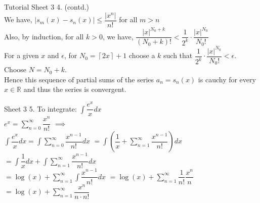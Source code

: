 \documentclass[aspectratio=169]{beamer}
\newcommand{\fc}[1]{\left\lceil #1 \right\rceil}
\newtheorem{defn}{Definition}
\begin{document}
\begin{frame}{Tutorial Sheet 3}
    4. (contd.) \\
    We have, \hspace{5pt} $ \displaystyle  |s_m(x)-s_n(x)| \leq \dfrac{|x^n|}{n!} $ for all $m > n$ \\
    Also, by induction, for all $k>0$, we have, \hspace{5pt} $\dfrac{|x|^{N_0+k}}{(N_0+k)!}< \dfrac{1}{2^k} \cdot \dfrac{|x|^{N_0}}{N_0!}$ \\
    \medskip
    For a given $x$ and $\epsilon$, for $N_0=\fc{2x}+1$ choose a $k$ such that $\dfrac{1}{2^k}\cdot \dfrac{|x|^{N_0}}{N_0!} < \epsilon$. \\
    Choose $N=N_0+k$. \\
    Hence this sequence of partial sums of the series $a_n=s_n(x)$ is cauchy for every $x \in \mathbb{R}$ and thus the series is convergent.
\end{frame}


\begin{frame}{Sheet 3}
    5. To integrate:
    $\displaystyle \int \dfrac{e^x}{x} dx$ \\
    $e^x=\displaystyle \sum_{n=0}^{\infty} \dfrac{x^n}{n!}$  $\implies$  \\
    \smallskip
    $\displaystyle \int \dfrac{e^x}{x} dx =  \displaystyle \int \sum_{n=0}^{\infty} \dfrac{x^{n-1}}{n!}dx$
    $=\displaystyle \int \left( \dfrac{1}{x} + \sum_{n=1}^{\infty} \dfrac{x^{n-1}}{n!}  \right) dx$
    $=\displaystyle \int \dfrac{1}{x} dx + \int \sum_{n=1}^{\infty} \dfrac{x^{n-1}}{n!} dx$ \\
    \medskip
    $=\displaystyle \log(x) + \sum_{n=1}^{\infty} \int  \dfrac{x^{n-1}}{n!} dx$
    $=\displaystyle \log(x) + \sum_{n=1}^{\infty} \dfrac{1}{n!} \dfrac{x^n}{n}$
    $=\displaystyle \log(x) + \sum_{n=1}^{\infty} \dfrac{x^n}{n \cdot n!}$ \\
\end{frame}
\end{document}
